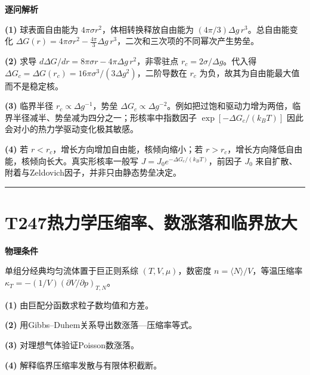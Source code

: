 \documentclass[UTF8,a4paper,11pt,oneside,openany]{ctexbook}
\begin{document}
\par\medskip\noindent\textbf{逐问解析}
\par\noindent\textbf{(1)} 球表面自由能为 \(4\pi\sigma r^2\)，体相转换释放自由能为 \((4\pi/3)\Delta g\,r^3\)。总自由能变化 \(\Delta G(r)=4\pi\sigma r^2-\frac{4\pi}{3}\Delta g\,r^3\)，二次和三次项的不同幂次产生势垒。
\par\noindent\textbf{(2)} 求导 \(d\Delta G/dr=8\pi\sigma r-4\pi\Delta g\,r^2\)，非零驻点 \(r_c=2\sigma/\Delta g\)。代入得 \(\Delta G_c=\Delta G(r_c)=16\pi\sigma^3/(3\Delta g^2)\)，二阶导数在 \(r_c\) 为负，故其为自由能最大值而不是稳定核。
\par\noindent\textbf{(3)} 临界半径 \(r_c\propto\Delta g^{-1}\)，势垒 \(\Delta G_c\propto\Delta g^{-2}\)。例如把过饱和驱动力增为两倍，临界半径减半、势垒减为四分之一；形核率中指数因子 \(\exp[-\Delta G_c/(k_BT)]\) 因此会对小的热力学驱动变化极其敏感。
\par\noindent\textbf{(4)} 若 \(r<r_c\)，增长方向增加自由能，核倾向缩小；若 \(r>r_c\)，增长方向降低自由能，核倾向长大。真实形核率一般写 \(J=J_0e^{-\Delta G_c/(k_BT)}\)，前因子 \(J_0\) 来自扩散、附着与Zeldovich因子，并非只由静态势垒决定。

\par\bigskip\hrule\bigskip
\section*{T247\quad 热力学压缩率、数涨落和临界放大}
\textbf{物理条件}\par 单组分经典均匀流体置于巨正则系综 \((T,V,\mu)\)，数密度 \(n=\langle N\rangle/V\)，等温压缩率 \(\kappa_T=-(1/V)(\partial V/\partial p)_{T,N}\)。
\par\noindent\textbf{(1)} 由巨配分函数求粒子数均值和方差。
\par\noindent\textbf{(2)} 用Gibbs–Duhem关系导出数涨落—压缩率等式。
\par\noindent\textbf{(3)} 对理想气体验证Poisson数涨落。
\par\noindent\textbf{(4)} 解释临界压缩率发散与有限体积截断。
\end{document}
